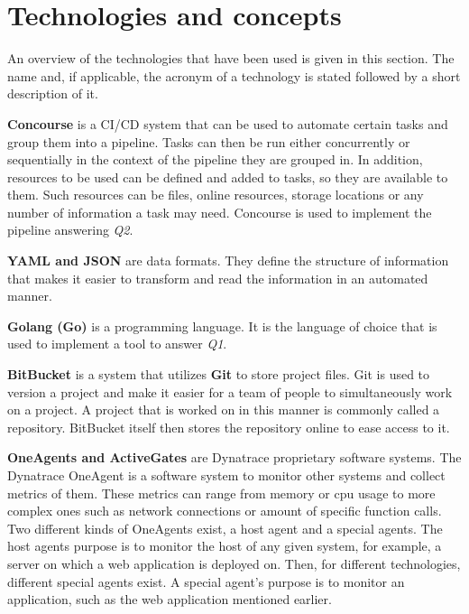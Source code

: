 \chapter{Technologies and concepts}\label{ch:technologies-used}

An overview of the technologies that have been used is given in this section.
The name and, if applicable, the acronym of a technology is stated followed by a short description of it.

\textbf{Concourse}\cite{concourse} is a CI/CD system that can be used to automate certain tasks and group them into a pipeline.
Tasks can then be run either concurrently or sequentially in the context of the pipeline they are grouped in.
In addition, resources to be used can be defined and added to tasks, so they are available to them.
Such resources can be files, online resources, storage locations or any number of information a task may need.
Concourse is used to implement the pipeline answering \textit{Q2}.

\textbf{YAML and JSON}\cite{yaml,json} are data formats.
They define the structure of information that makes it easier to transform and read the information in an automated manner.

\textbf{Golang (Go)}\cite{golang} is a programming language.
It is the language of choice that is used to implement a tool to answer \textit{Q1}.

\textbf{BitBucket}\cite{bitbucket} is a system that utilizes \textbf{Git}\cite{git} to store project files.
Git is used to version a project and make it easier for a team of people to simultaneously work on a project.
A project that is worked on in this manner is commonly called a repository.
BitBucket itself then stores the repository online to ease access to it.

\textbf{OneAgents and ActiveGates}\cite{oneagents,activegates} are Dynatrace proprietary software systems.
The Dynatrace OneAgent\cite{oneagents} is a software system to monitor other systems and collect metrics of them.
These metrics can range from memory or cpu usage to more complex ones such as network connections or amount of specific function calls.
Two different kinds of OneAgents exist, a host agent and a special agents.
The host agents purpose is to monitor the host of any given system, for example, a server on which a web application is deployed on.
Then, for different technologies, different special agents exist.
A special agent's purpose is to monitor an application, such as the web application mentioned earlier.

